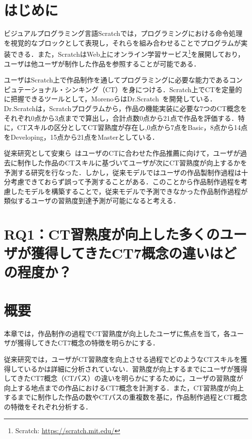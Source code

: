 \documentclass[submit,ses,noauthor]{ipsj}
\begin{document}
\maketitle

\section{はじめに}
ビジュアルプログラミング言語Scratch\cite{Resnick_2009}では，プログラミングにおける命令処理を視覚的なブロックとして表現し，それらを組み合わせることでプログラムが実装できる．また，ScratchはWeb上にオンライン学習サービス\footnote{Scratch: \url{https://scratch.mit.edu/}}を展開しており，ユーザは他ユーザが制作した作品を参照することが可能である．

ユーザはScratch上で作品制作を通してプログラミングに必要な能力であるコンピュテーショナル・シンキング（CT）を身につける．Scratch上でCTを定量的に把握できるツールとして，MorenoらはDr.Scratch~\cite{Moreno_2015}を開発している．Dr.Scratchは，Scratchプログラムから，作品の機能実装に必要な7つのCT概念をそれぞれ0点から3点までで算出し，合計点数0点から21点で作品を評価する．特に，CTスキルの区分としてCT習熟度が存在し,0点から7点をBasic，8点から14点をDeveloping，15点から21点をMasterとしている．

従来研究として安東ら~\cite{Ando_2021}はユーザのCTに合わせた作品推薦に向けて，ユーザが過去に制作した作品のCTスキルに基づいてユーザが次にCT習熟度が向上するかを予測する研究を行なった．しかし，従来モデルではユーザの作品製制作過程は十分考慮できておらず誤って予測することがある．このことから作品制作過程を考慮したモデルを構築することで，従来モデルで予測できなかった作品制作過程が類似するユーザの習熟度到達予測が可能になると考える．


\section{RQ1：CT習熟度が向上した多くのユーザが獲得してきたCT7概念の違いはどの程度か？}\label{sec:chapter_3}
\section{概要}
本章では，作品制作の過程でCT習熟度が向上したユーザに焦点を当て，各ユーザが獲得してきたCT7概念の特徴を明らかにする．

従来研究では，ユーザがCT習熟度を向上させる過程でどのようなCTスキルを獲得しているかは詳細に分析されていない．習熟度が向上するまでにユーザが獲得してきたCT7概念（CTパス）の違いを明らかにするために，ユーザの習熟度が向上する地点までの作品におけるCT7概念を計測する．また，CT習熟度が向上するまでに制作した作品の数やCTパスの重複数を基に，作品制作過程とCT概念の特徴をそれぞれ分析する．
\end{document}
